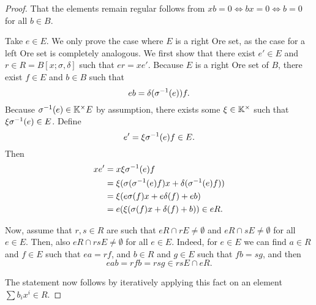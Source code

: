 \begin{proof}
	That the elements remain regular follows from $x b = 0 \iff b x = 0 \iff b = 0$ for all
	$b \in B$.

	Take $e \in E$. We only prove the case where $E$ is a right Ore set, as the case for a
	left Ore set is completely analogous. We first show that there exist $e' \in E$ and $r
		\in R = B[x; \sigma, \delta]$ such that $er = x e'$. Because $E$ is a right Ore set of
	$B$, there exist $f\in E$ and $b \in B$ such that
	\begin{equation*}
		e b = \delta(\sigma^{-1}(e))f.
	\end{equation*}
	Because $\sigma^{-1}(e) \in \mathbb{K}^\times E$ by assumption, there exists some $\xi \in \mathbb{K}^\times$ such that $\xi \sigma^{-1}(e) \in E$.
	Define
	\begin{equation*}
		e' = \xi \sigma^{-1}(e)f \in E.
	\end{equation*}
	Then
	\begin{align*}
		xe' & = x\xi\sigma^{-1}(e)f                                     \\
		    & = \xi (\sigma(\sigma^{-1}(e)f)x + \delta(\sigma^{-1}(e)f)) \\
		    & = \xi(e\sigma(f)x + e \delta(f) + e b)                   \\
		    & = e(\xi (\sigma(f)x + \delta(f) + b)) \in eR.
	\end{align*}

	Now, assume that $r,s \in R$ are such that $e R \cap r E \neq \emptyset$ and $e R \cap
		s E \neq \emptyset$ for all $e \in E$. Then, also $e R \cap rs E \neq \emptyset$ for
	all $e\in E$. Indeed, for $e \in E$ we can find $a \in R$ and $f \in E$ such that $ea =
		r f$, and $b \in R$ and $g \in E$ such that $f b = s g$, and then
	\begin{equation*}
		e a b = r f b = r s g \in rs E \cap e R.
	\end{equation*}

	The statement now follows by iteratively applying this fact on an element $\sum b_i x^i
		\in R$.
\end{proof}

